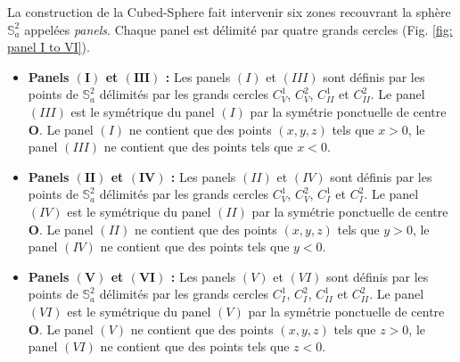 La construction de la Cubed-Sphere fait intervenir six zones recouvrant la sphère $\mathbb{S}_a^2$ appelées \textit{panels}. Chaque panel est délimité par quatre grands cercles (Fig. \ref{fig: panel I to VI}).

\begin{definition}
\begin{itemize}
\item  \textbf{Panels $\mathbf{(I)}$ et $\mathbf{(III)}$ : }Les panels $(I)$ et $(III)$ sont définis par les points de $\mathbb{S}_a^2$ délimités par les grands cercles $C_V^1$, $C_V^2$, $C_{II}^1$ et $C_{II}^2$. Le panel $(III)$ est le symétrique du panel $(I)$ par la symétrie ponctuelle de centre $\mathbf{O}$. Le panel $(I)$ ne contient que des points $(x,y,z)$ tels que $x>0$, le panel $(III)$ ne contient que des points tels que $x<0$.
\item \textbf{Panels $\mathbf{(II)}$ et $\mathbf{(IV)}$ : }Les panels $(II)$ et $(IV)$ sont définis par les points de $\mathbb{S}_a^2$ délimités par les grands cercles $C_V^1$, $C_V^2$, $C_{I}^1$ et $C_{I}^2$. Le panel $(IV)$ est le symétrique du panel $(II)$ par la symétrie ponctuelle de centre $\mathbf{O}$. Le panel $(II)$ ne contient que des points $(x,y,z)$ tels que $y>0$, le panel $(IV)$ ne contient que des points tels que $y<0$.
\item \textbf{Panels $\mathbf{(V)}$ et $\mathbf{(VI)}$ : }Les panels $(V)$ et $(VI)$ sont définis par les points de $\mathbb{S}_a^2$ délimités par les grands cercles $C_I^1$, $C_I^2$, $C_{II}^1$ et $C_{II}^2$. Le panel $(VI)$ est le symétrique du panel $(V)$ par la symétrie ponctuelle de centre $\mathbf{O}$. Le panel $(V)$ ne contient que des points $(x,y,z)$ tels que $z>0$, le panel $(VI)$ ne contient que des points tels que $z<0$.
\end{itemize}
\end{definition}






